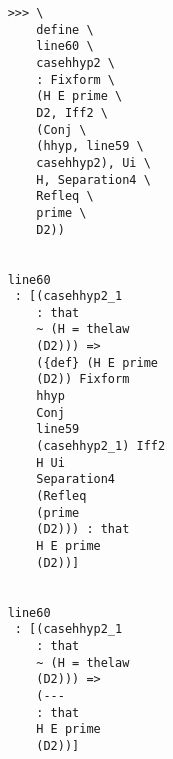 \documentclass[12pt]{article}
\begin{document}
\begin{verbatim}
                                                >>> \
                                                    define \
                                                    line60 \
                                                    casehhyp2 \
                                                    : Fixform \
                                                    (H E prime \
                                                    D2, Iff2 \
                                                    (Conj \
                                                    (hhyp, line59 \
                                                    casehhyp2), Ui \
                                                    H, Separation4 \
                                                    Refleq \
                                                    prime \
                                                    D2))


                                                line60 
                                                 : [(casehhyp2_1 
                                                    : that 
                                                    ~ (H = thelaw 
                                                    (D2))) => 
                                                    ({def} (H E prime 
                                                    (D2)) Fixform 
                                                    hhyp 
                                                    Conj 
                                                    line59 
                                                    (casehhyp2_1) Iff2 
                                                    H Ui 
                                                    Separation4 
                                                    (Refleq 
                                                    (prime 
                                                    (D2))) : that 
                                                    H E prime 
                                                    (D2))]


                                                line60 
                                                 : [(casehhyp2_1 
                                                    : that 
                                                    ~ (H = thelaw 
                                                    (D2))) => 
                                                    (--- 
                                                    : that 
                                                    H E prime 
                                                    (D2))]



\end{verbatim}
\end{document}

